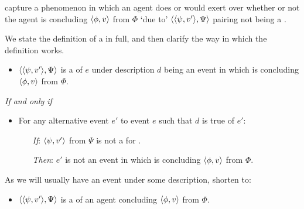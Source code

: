 \begin{note}
   capture a phenomenon in which an agent does or would exert \ninf{} over whether or not the agent is concluding \(\langle \phi, v \rangle\) from \(\Phi\) `due to' \(\langle \langle \psi, v' \rangle, \Psi \rangle\) pairing not being a \fc{}.

  We state the definition of a \requ{} in full, and then clarify the way in which the definition works.

  \begin{definition}[A \requ{0}]
    \label{def:requ}


    \begin{itemize}
    \item
      \(\langle \langle \psi, v' \rangle, \Psi \rangle\) is a \emph{\requ{}} of \(e\) under description \(d\) being an event in which \vAgent{} is concluding \(\langle \phi, v \rangle\) from \(\Phi\).
    \end{itemize}

    \emph{If and only if}

    \begin{itemize}
    \item
      For any alternative event \(e'\) to event \(e\) such that \(d\) is true of \(e'\):
      \begin{itemize}
      \item[\emph{If}:]
        \(\langle \psi, v' \rangle\) from \(\Psi\) is not a \fc{} for \vAgent{}.
      \item[\emph{Then}:]
        \(e'\) is not an event in which \vAgent{} is concluding \(\langle \phi, v \rangle\) from \(\Phi\).
      \end{itemize}
    \end{itemize}
    \vspace{-\baselineskip}
  \end{definition}

  As we will usually have an event under some description, shorten to:
  \begin{itemize}
  \item
    \(\langle \langle \psi, v' \rangle, \Psi \rangle\) is a \requ{} of an agent concluding \(\langle \phi, v \rangle\) from \(\Phi\).
  \end{itemize}
\end{note}

